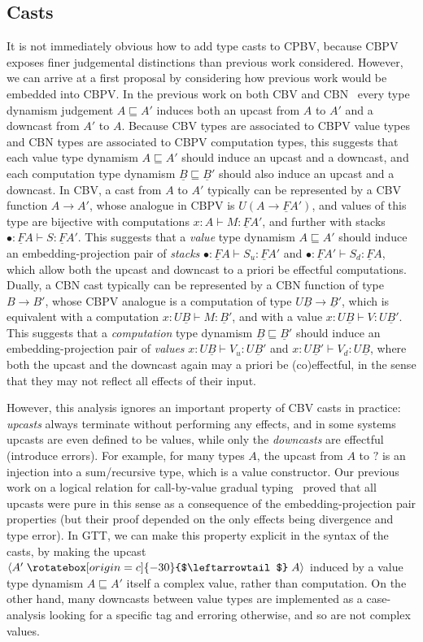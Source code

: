 \documentclass[acmsmall,screen,12pt]{acmart}
\renewcommand{\u}{\underline}
\newcommand{\ltdyn}{\sqsubseteq}
\newcommand{\dynv}{{?}}
\newcommand{\uarrow}{\mathrel{\rotatebox[origin=c]{-30}{$\leftarrowtail$}}}
\newcommand{\upcast}[2]{\langle{#2}\uarrow{#1}\rangle}
\begin{document}
\subsection{Casts}
\label{sec:gtt-casts}

It is not immediately obvious how to add type casts to CPBV, because
CBPV exposes finer judgemental distinctions than previous work
considered.  However, we can arrive at a first proposal by considering
how previous work would be embedded into CBPV.
%
In the previous work on both CBV and
CBN~\citep{newahmed18,newlicata2018-fscd} every type dynamism judgement
$A \ltdyn A'$ induces both an upcast from $A$ to $A'$ and a downcast
from $A'$ to $A$.
%
Because CBV types are associated to CBPV value types and CBN types are
associated to CBPV computation types, this suggests that each value type
dynamism $A \ltdyn A'$ should induce an upcast and a downcast, and each
computation type dynamism $\u B \ltdyn \u B'$ should also induce an
upcast and a downcast.
%
In CBV, a cast from $A$ to $A'$ typically can be represented by a CBV
function $A \to A'$, whose analogue in CBPV is $U(A \to \u F A')$, and
values of this type are bijective with computations $x : A \vdash M : \u
F A'$, and further with stacks $\bullet : \u F A \vdash
S : \u F A'$. This suggests that a
\emph{value} type dynamism $A \ltdyn A'$ should induce an
embedding-projection pair of \emph{stacks} $\bullet : \u F A \vdash S_u
: \u F A'$ and $\bullet : \u F A' \vdash S_d : \u F A$, which allow both
the upcast and downcast to a priori be effectful computations.
%
Dually, a CBN cast typically can be represented by a CBN function of
type $B \to B'$, whose CBPV analogue is a computation of type $U \u B
\to \u B'$, which is equivalent with a computation $x : U \u B \vdash M : \u B'$,
and with a value $x : U \u B \vdash V : U \u B'$. This suggests that a
\emph{computation} type dynamism $\u B \ltdyn \u B'$ should induce an
embedding-projection pair of \emph{values} $x : U \u B \vdash V_u : U \u
B'$ and $x : U \u B' \vdash V_d : U \u B$, where both the upcast and the
downcast again may a priori be (co)effectful, in the sense that they may
not reflect all effects of their input.

However, this analysis ignores an important property of CBV casts in practice:
\emph{upcasts} always terminate without performing any effects, and in
some systems upcasts are even defined to be values, while only the
\emph{downcasts} are effectful (introduce errors).  For example, for many types $A$, the
upcast from $A$ to $\dynv$ is an injection into a sum/recursive type,
which is a value constructor.  Our previous work on a logical
relation for call-by-value gradual typing~\cite{newahmed18} proved that all
upcasts were pure in this sense as a consequence of the embedding-projection pair properties (but their proof depended on the only effects being
divergence and type error).
In GTT, we can make this property explicit
in the syntax of the casts, by making the upcast $\upcast{A}{A'}$
induced by a value type dynamism $A \ltdyn A'$ itself a complex value,
rather than computation.  On the other hand, many downcasts between value
types are implemented as a case-analysis looking for a specific
tag and erroring otherwise, and so are not complex values.
\end{document}
